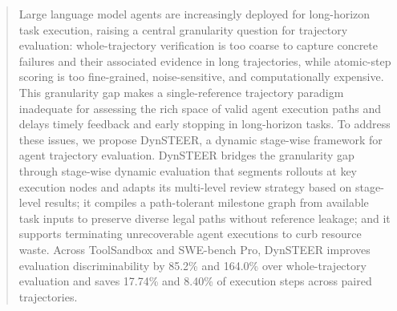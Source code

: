 \begin{abstract}
Large language model agents are increasingly deployed for long-horizon task execution, raising a central granularity question for trajectory evaluation: whole-trajectory verification is too coarse to capture concrete failures and their associated evidence in long trajectories, while atomic-step scoring is too fine-grained, noise-sensitive, and computationally expensive.
This granularity gap makes a single-reference trajectory paradigm inadequate for assessing the rich space of valid agent execution paths and delays timely feedback and early stopping in long-horizon tasks.
To address these issues, we propose DynSTEER, a dynamic stage-wise framework for agent trajectory evaluation.
DynSTEER bridges the granularity gap through stage-wise dynamic evaluation that segments rollouts at key execution nodes and adapts its multi-level review strategy based on stage-level results; it compiles a path-tolerant milestone graph from available task inputs to preserve diverse legal paths without reference leakage; and it supports terminating unrecoverable agent executions to curb resource waste.
Across ToolSandbox and SWE-bench Pro, DynSTEER improves evaluation discriminability by 85.2\% and 164.0\% over whole-trajectory evaluation and saves 17.74\% and 8.40\% of execution steps across paired trajectories.
\end{abstract}
